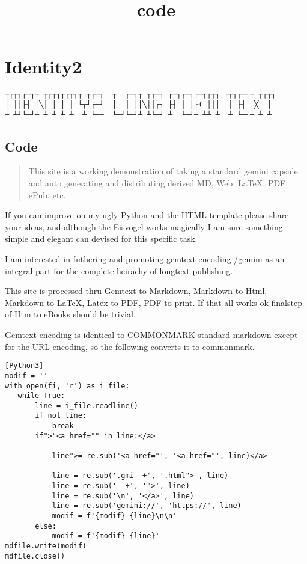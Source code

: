 \documentclass[
]{article}
\title{code}
\author{}
\date{}
\begin{document}
\maketitle

\section{Identity2}

\begin{verbatim}
┬┌┬┐┌─┐┬ ┬┌┬┐┬┌┬┐┬ ┬┌─┐  ┬  ┌─┐┬ ┬┌─┐ ┌─┐┌─┐┌─╮┌┬┐ ┌┬┐┌─┐┬ ┬┌┬┐
│ ││├┤ │╲│ │ │ │ └┬┘┌─┘  │  │ ││╲││┌┐ ├┤ │ │├( │││  │ ├┤  ╳  │
┴ ┴┘└─┘┴ ┴ ┴ ┴ ┴  ┴ └──  └─┘└─┘┴ ┴└─┘ ┴  └─┘┴ ┴┴ ┴  ┴ └─┘┴ ┴ ┴
\end{verbatim}

\subsection{Code}

\begin{quote}
This site is a working demonstration of taking a standard gemini capsule
and auto generating and distributing derived MD, Web, LaTeX, PDF, ePub,
etc.
\end{quote}

If you can improve on my ugly Python and the HTML template please share
your ideas, and although the Eisvogel works magically I am sure
something simple and elegant can devised for this specific task.

I am interested in futhering and promoting gemtext encoding /gemini as
an integral part for the complete heirachy of longtext publishing.

This site is processed thru Gemtext to Markdown, Markdown to Html,
Markdown to LaTeX, Latex to PDF, PDF to print. If that all works ok
finalstep of Htm to eBooks should be trivial.

Gemtext encoding is identical to COMMONMARK standard markdown except for
the URL encoding, so the following converts it to commonmark.

\begin{verbatim}
[Python3]
modif = ''
with open(fi, 'r') as i_file:
   while True:
       line = i_file.readline()
       if not line:
           break
       if">"<a href="" in line:</a>

           line">= re.sub('<a href="', '<a href="', line)</a>

           line = re.sub('.gmi  +', '.html">', line)
           line = re.sub('  +', '">', line)
           line = re.sub('\n', '</a>', line)
           line = re.sub('gemini://', 'https://', line)
           modif = f'{modif} {line}\n\n'
       else:
           modif = f'{modif} {line}'              
mdfile.write(modif)
mdfile.close()
\end{verbatim}
\end{document}
